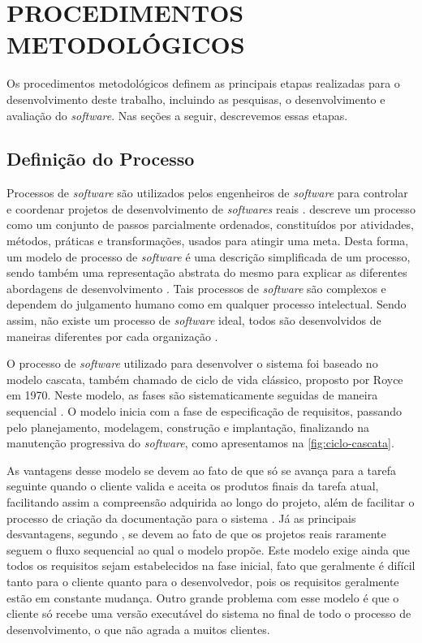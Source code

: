 \chapter{PROCEDIMENTOS METODOLÓGICOS}
\label{chap:procedimentos-metodologicos}

Os procedimentos metodológicos definem as principais etapas realizadas para o desenvolvimento deste trabalho, incluindo as pesquisas, o desenvolvimento e avaliação do \textit{software}. Nas seções a 
seguir, descrevemos essas etapas.

\section{Definição do Processo}

Processos de \textit{software} são utilizados pelos engenheiros de \textit{software} para controlar e coordenar projetos de desenvolvimento de \textit{softwares} reais \cite{talma2006desenvolvimento}. 
 descreve um processo como um conjunto de passos parcialmente ordenados, constituídos por atividades, 
métodos, práticas e transformações, usados para atingir uma meta. 
Desta forma, um modelo de processo de \textit{software} é uma descrição simplificada de um processo, sendo também uma representação abstrata do mesmo para explicar as diferentes abordagens de 
desenvolvimento \cite{sommerville2003engenharia}. Tais processos de \textit{software} são complexos e dependem do julgamento humano como 
em qualquer processo intelectual. Sendo assim, não existe um processo de \textit{software} ideal, todos são desenvolvidos de maneiras 
diferentes por cada organização \cite{sommerville2003engenharia}.

O processo de \textit{software} utilizado para desenvolver o sistema foi baseado no modelo cascata, também chamado de ciclo de vida clássico, proposto por Royce em 1970. Neste modelo, as fases são 
sistematicamente seguidas de maneira sequencial \cite{pressman2006engenharia}. O modelo inicia com a fase de especificação de requisitos, passando pelo planejamento, modelagem, construção e 
implantação, finalizando na manutenção progressiva do \textit{software}, como apresentamos na \autoref{fig:ciclo-cascata}.

As vantagens desse modelo se devem ao fato de que só se avança para a tarefa seguinte quando o cliente valida e aceita os produtos finais da tarefa atual, facilitando assim a compreensão adquirida ao 
longo do projeto, além de facilitar o processo de criação da documentação para o sistema \cite{pressman2006engenharia}. Já as principais desvantagens, segundo , se 
devem ao fato de que os projetos reais raramente seguem o fluxo sequencial ao qual o modelo propõe. Este modelo exige ainda que todos os requisitos sejam estabelecidos na fase 
inicial, fato que geralmente é difícil tanto para o cliente quanto para o desenvolvedor, pois os requisitos geralmente est\~ao em constante mudan\c{c}a. Outro grande problema com esse modelo é que o 
cliente só recebe uma versão executável do sistema no final de todo o processo de desenvolvimento, o que não agrada a muitos clientes.

